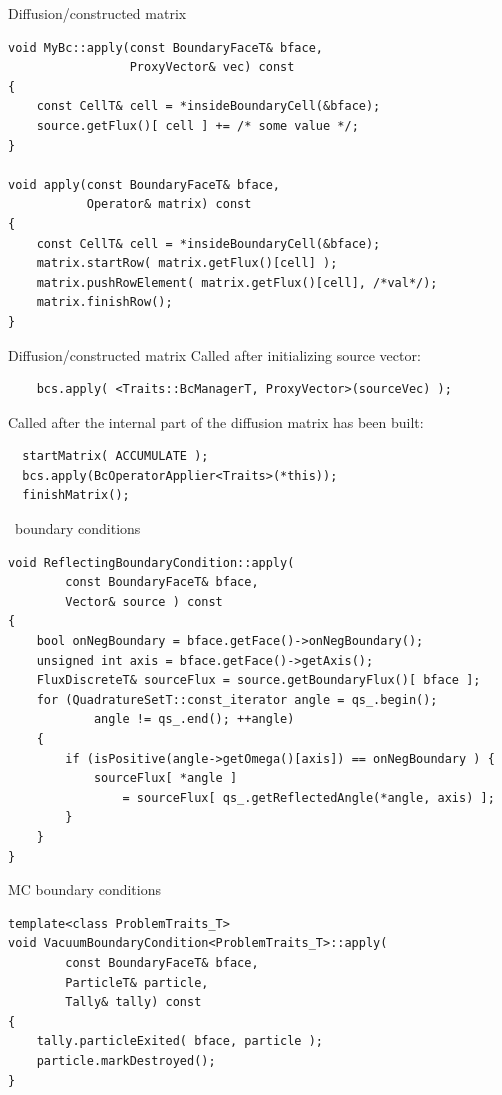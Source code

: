 \documentclass{beamer}
\begin{document}
\begin{frame}[fragile]{Diffusion/constructed matrix}
  \begin{verbatim}
void MyBc::apply(const BoundaryFaceT& bface,
                 ProxyVector& vec) const
{
    const CellT& cell = *insideBoundaryCell(&bface);
    source.getFlux()[ cell ] += /* some value */;
}

void apply(const BoundaryFaceT& bface,
           Operator& matrix) const
{
    const CellT& cell = *insideBoundaryCell(&bface);
    matrix.startRow( matrix.getFlux()[cell] );
    matrix.pushRowElement( matrix.getFlux()[cell], /*val*/);
    matrix.finishRow();
}
  \end{verbatim}
\end{frame}

\begin{frame}[fragile]{Diffusion/constructed matrix}
Called after initializing source vector:
\begin{verbatim}
	bcs.apply( <Traits::BcManagerT, ProxyVector>(sourceVec) );
\end{verbatim}
  
Called after the internal part of the diffusion matrix has been built:
\begin{verbatim}
  startMatrix( ACCUMULATE );
  bcs.apply(BcOperatorApplier<Traits>(*this));
  finishMatrix();
\end{verbatim}
\end{frame}

\begin{frame}[fragile]{\SN\ boundary conditions}
  \begin{verbatim}
void ReflectingBoundaryCondition::apply(
        const BoundaryFaceT& bface,
        Vector& source ) const
{
    bool onNegBoundary = bface.getFace()->onNegBoundary();
    unsigned int axis = bface.getFace()->getAxis();
    FluxDiscreteT& sourceFlux = source.getBoundaryFlux()[ bface ];
    for (QuadratureSetT::const_iterator angle = qs_.begin();
            angle != qs_.end(); ++angle)
    {
        if (isPositive(angle->getOmega()[axis]) == onNegBoundary ) {
            sourceFlux[ *angle ]
                = sourceFlux[ qs_.getReflectedAngle(*angle, axis) ];
        }
    }
}
  \end{verbatim}
\end{frame}

\begin{frame}[fragile]{MC boundary conditions}
  \begin{verbatim}
template<class ProblemTraits_T>
void VacuumBoundaryCondition<ProblemTraits_T>::apply(
        const BoundaryFaceT& bface,
        ParticleT& particle,
        Tally& tally) const
{
    tally.particleExited( bface, particle );
    particle.markDestroyed();
}
  \end{verbatim}
\end{frame}
\end{document}
